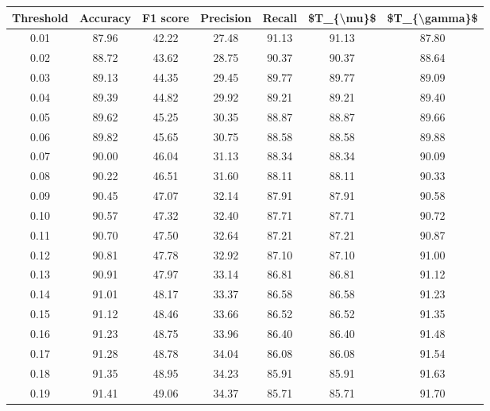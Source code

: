 \begin{tabular}{|c|c|c|c|c|c|c|}
\hline
 Threshold &  Accuracy &  F1 score &  Precision &  Recall &  \$T\_\{\textbackslash mu\}\$ &  \$T\_\{\textbackslash gamma\}\$ \\
\hline
      0.01 &     87.96 &     42.22 &      27.48 &   91.13 &      91.13 &         87.80 \\
      0.02 &     88.72 &     43.62 &      28.75 &   90.37 &      90.37 &         88.64 \\
      0.03 &     89.13 &     44.35 &      29.45 &   89.77 &      89.77 &         89.09 \\
      0.04 &     89.39 &     44.82 &      29.92 &   89.21 &      89.21 &         89.40 \\
      0.05 &     89.62 &     45.25 &      30.35 &   88.87 &      88.87 &         89.66 \\
      0.06 &     89.82 &     45.65 &      30.75 &   88.58 &      88.58 &         89.88 \\
      0.07 &     90.00 &     46.04 &      31.13 &   88.34 &      88.34 &         90.09 \\
      0.08 &     90.22 &     46.51 &      31.60 &   88.11 &      88.11 &         90.33 \\
      0.09 &     90.45 &     47.07 &      32.14 &   87.91 &      87.91 &         90.58 \\
      0.10 &     90.57 &     47.32 &      32.40 &   87.71 &      87.71 &         90.72 \\
      0.11 &     90.70 &     47.50 &      32.64 &   87.21 &      87.21 &         90.87 \\
      0.12 &     90.81 &     47.78 &      32.92 &   87.10 &      87.10 &         91.00 \\
      0.13 &     90.91 &     47.97 &      33.14 &   86.81 &      86.81 &         91.12 \\
      0.14 &     91.01 &     48.17 &      33.37 &   86.58 &      86.58 &         91.23 \\
      0.15 &     91.12 &     48.46 &      33.66 &   86.52 &      86.52 &         91.35 \\
      0.16 &     91.23 &     48.75 &      33.96 &   86.40 &      86.40 &         91.48 \\
      0.17 &     91.28 &     48.78 &      34.04 &   86.08 &      86.08 &         91.54 \\
      0.18 &     91.35 &     48.95 &      34.23 &   85.91 &      85.91 &         91.63 \\
      0.19 &     91.41 &     49.06 &      34.37 &   85.71 &      85.71 &         91.70 \\

\end{tabular}
